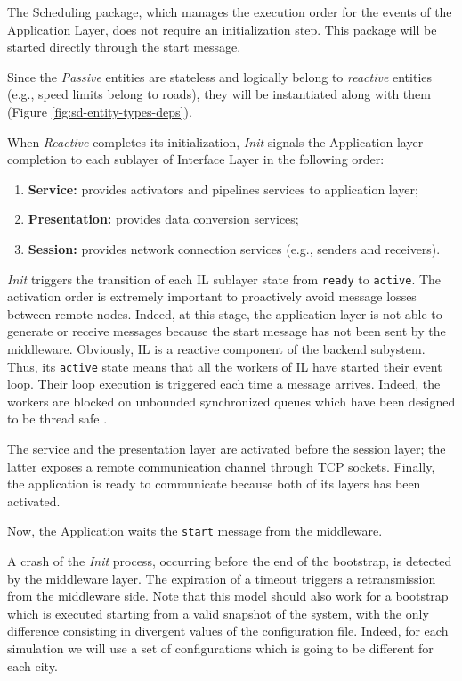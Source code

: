 The Scheduling package, which manages the execution order for the events of the
Application Layer, does not require an initialization step. This package
will be started directly through the start message.


Since the \textit{Passive} entities are stateless and
logically belong to \textit{reactive} entities (e.g., speed limits belong to
roads), they will be instantiated along with them
(Figure \ref{fig:sd-entity-types-deps}).

When \textit{Reactive} completes its initialization, \textit{Init}
signals the Application layer completion to each sublayer of Interface Layer
in the following order:

\begin{enumerate}
  \item \textbf{Service:} provides activators and pipelines services to
    application layer;
  \item \textbf{Presentation:} provides data conversion services;
  \item \textbf{Session:} provides network connection services (e.g., senders
  and receivers).
\end{enumerate}

\textit{Init} triggers the transition of each IL sublayer state from
\verb|ready| to \verb|active|.
The activation order is extremely important to proactively avoid
message losses between remote nodes.
Indeed, at this stage, the application layer is
not able to generate or receive messages because the start message has not
been sent by the middleware. Obviously, IL is a reactive component
of the backend subystem. Thus, its \verb|active| state means
that all the workers of IL have started their event loop.
Their loop execution is triggered each time a
message arrives. Indeed, the workers are blocked on unbounded synchronized
queues which have been designed to be thread safe \cite{taft2006ada}.


The service and the presentation layer are activated before the session layer;
the latter exposes a remote communication channel through TCP
sockets.
Finally, the application is ready to communicate because both of its layers
has been activated.

Now, the Application waits the \verb|start|
message from the middleware.


A crash of the \textit{Init} process, occurring before the end of the
bootstrap, is detected by the middleware layer. The expiration
of a timeout triggers a retransmission from the middleware side.
Note that this model should also work for a bootstrap which is executed
starting
from a valid snapshot of the system, with the only difference consisting in
divergent values of the configuration file.
Indeed, for each simulation we will use a set
of configurations which is going to be different for each city.

